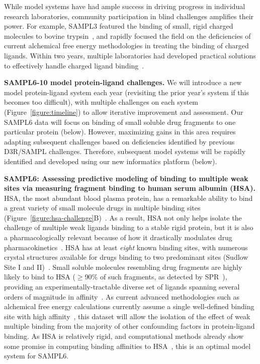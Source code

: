 \documentclass[11pt]{article}
\begin{document}
While model systems have had ample success in driving progress in individual research laboratories, community participation in blind challenges amplifies their power.
For example, SAMPL3 featured the binding of small, rigid charged molecules to bovine trypsin~\cite{Newman:2011:JComputAidedMolDes}, and rapidly focused the field on the deficiencies of current alchemical free energy methodologies in treating the binding of charged ligands.
Within two years, multiple laboratories had developed practical solutions to effectively handle charged ligand binding~\cite{Rocklin:2013:TheJournalofChemicalPhysics, lin_overview_2014, Reif:2014:JournalofComputationalChemistry}.

\textbf{SAMPL6-10 model protein-ligand challenges.} 
We will introduce a new model protein-ligand system each year (revisiting the prior year's system if this becomes too difficult), with multiple challenges on each system (Figure~\ref{figure:timeline}) to allow iterative improvement and assessment.
Our SAMPL6 data will focus on binding of small soluble drug fragments to one particular protein (below). 
However, maximizing gains in this area requires adapting subsequent challenges based on deficiencies identified by previous D3R/SAMPL challenges.
Therefore, subsequent model systems will be rapidly identified and developed using our new informatics platform (below).

\textbf{SAMPL6: Assessing predictive modeling of binding to multiple weak sites via measuring fragment binding to human serum albumin (HSA).}
HSA, the most abundant blood plasma protein, has a remarkable ability to bind a great variety of small molecule drugs in multiple binding sites (Figure~\ref{figure:hsa-challenge}B)~\cite{Fasano:2005:IUBMBLife(InternationalUnionofBiochemistryandMolecularBiology:Life)}.
As a result, HSA not only helps isolate the challenge of multiple weak ligands binding to a stable rigid protein, but it is also a pharmacologically relevant because of how it drastically modulates drug pharmacokinetics~\cite{Hall:2013:JournalofChemicalInformationandModeling}.
HSA has at least \emph{eight} known binding sites, with numerous crystal structures available for drugs binding to two predominant sites (Sudlow Site I and II)~\cite{Hall:2013:JournalofChemicalInformationandModeling}.
Small soluble molecules resembling drug fragments are highly likely to bind to HSA ($\ge$90\% of such fragments, as detected by SPR~\cite{Elinder:2011:JournalofBiomolecularScreening}), providing an experimentally-tractable diverse set of ligands spanning several orders of magnitude in affinity~\cite{Elinder:2011:JournalofBiomolecularScreening}.
As current advanced methodologies such as alchemical free energy calculations currently assume a single well-defined binding site with high affinity~\cite{Gilson:1997:BiophysicalJournal}, this dataset will allow the isolation of the effect of weak multiple binding from the majority of other confounding factors in protein-ligand binding.
As HSA is relatively rigid, and computational methods already show some promise in computing binding affinities to HSA~\cite{Hall:2013:JournalofChemicalInformationandModeling,Lexa:2014:PLoSONE,Evoli:2016:bioRxiv}, this is an optimal model system for SAMPL6.
\end{document}
